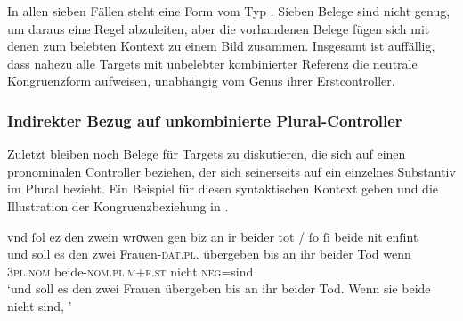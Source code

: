 In allen sieben Fällen steht eine Form vom Typ . Sieben Belege
sind nicht genug, um daraus eine Regel abzuleiten, aber die vorhandenen Belege
fügen sich mit denen zum belebten Kontext zu einem Bild zusammen. Insgesamt ist
auffällig, dass nahezu alle Targets mit unbelebter kombinierter Referenz die
neutrale Kongruenzform  aufweisen, unabhängig vom Genus ihrer
Erstcontroller.

\subsubsection{Indirekter Bezug auf unkombinierte Plural-Controller}
\label{subsubsec:beid2p2snglncao}

Zuletzt bleiben noch Belege für Targets zu diskutieren, die sich auf einen
pronominalen Controller beziehen, der sich seinerseits auf ein einzelnes
Substantiv im Plural bezieht. Ein Beispiel für diesen syntaktischen Kontext
geben  und die Illustration der Kongruenzbeziehung in
.

\begin{exe}
\ex \label{ex:beid2p2snglncao}
	\gll vnd ſol ez den zwein wroͮwen gen biz an ir beider tot / ſo
		ſi beide nit enſint \textelp{} \\
		und soll es den zwei Frauen-\textsc{dat.pl.\FemF} übergeben bis an ihr
		beider Tod {} wenn \textsc{3pl\subF.nom} beide-\textsc{nom.pl.m+f\subF.st}
		nicht \textsc{neg}=sind {} \\
	\trans `und soll es den zwei Frauen übergeben bis an ihr beider Tod.
		Wenn sie beide nicht  sind, \textelp{}'
		\parencites(Nr.~2568, Sirnau, Kr.~Esslingen, 1297)[3,31]{cao4}
\end{exe}

